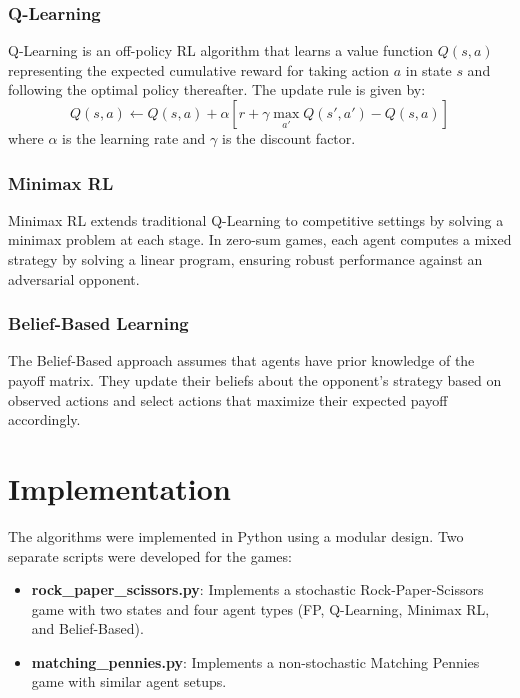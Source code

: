 \documentclass[11pt]{article}
\begin{document}
\subsubsection{Q-Learning}
Q-Learning is an off-policy RL algorithm that learns a value function \( Q(s,a) \) representing the expected cumulative reward for taking action \( a \) in state \( s \) and following the optimal policy thereafter. The update rule is given by:
\[
Q(s,a) \leftarrow Q(s,a) + \alpha \left[ r + \gamma \max_{a'} Q(s',a') - Q(s,a) \right]
\]
where \( \alpha \) is the learning rate and \( \gamma \) is the discount factor.
    
\subsubsection{Minimax RL}
Minimax RL extends traditional Q-Learning to competitive settings by solving a minimax problem at each stage. In zero-sum games, each agent computes a mixed strategy by solving a linear program, ensuring robust performance against an adversarial opponent.
    
\subsubsection{Belief-Based Learning}
The Belief-Based approach assumes that agents have prior knowledge of the payoff matrix. They update their beliefs about the opponent’s strategy based on observed actions and select actions that maximize their expected payoff accordingly.
    
\section{Implementation}
The algorithms were implemented in Python using a modular design. Two separate scripts were developed for the games:
    
\begin{itemize}[noitemsep]
    \item \textbf{rock\_paper\_scissors.py}: Implements a stochastic Rock-Paper-Scissors game with two states and four agent types (FP, Q-Learning, Minimax RL, and Belief-Based).
    \item \textbf{matching\_pennies.py}: Implements a non-stochastic Matching Pennies game with similar agent setups.
\end{itemize}
    
\end{document}
